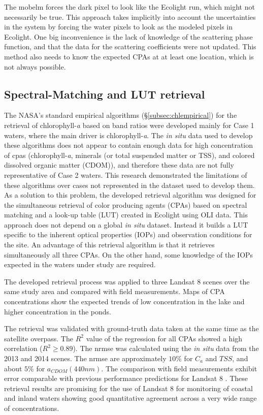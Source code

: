 The \gls{mobelm} forces the dark pixel to look like the Ecolight run, which might not necessarily be true. This approach takes implicitly into account the uncertainties in the system by forcing the water pixels to look as the modeled pixels in Ecolight. One big inconvenience is the lack of knowledge of the scattering phase function, and that the data for the scattering coefficients were not updated. This method also needs to know the expected CPAs at at least one location, which is not always possible.

\subsection{Spectral-Matching and LUT retrieval}
The NASA's standard empirical algorithms (\S\ref{subsec:chlempirical}) for the retrieval of chlorophyll-{\it a} based on band ratios were developed mainly for Case 1 waters, where the main driver is chlorophyll-{\it a}. The {\it in situ} data used to develop these algorithms does not appear to contain enough data for high concentration of \gls{cpas} (chlorophyll-{\it a}, minerals (or total suspended matter or TSS), and colored dissolved organic matter (CDOM)), and therefore these data are not fully representative of Case 2 waters. This research demonstrated the limitations of these algorithms over cases not represented in the dataset used to develop them. As a solution to this problem, the developed retrieval algorithm was designed for the simultaneous retrieval of color producing agents (CPAs) based on spectral matching and a look-up table (LUT) created in Ecolight using OLI data. This approach does not depend on a global {\it in situ} dataset. Instead it builds a LUT specific to the inherent optical properties (IOPs) and observation conditions for the site. An advantage of this retrieval algorithm is that it retrieves simultaneously all three CPAs. On the other hand, some knowledge of the IOPs expected in the waters under study are required.

The developed retrieval process was applied to three  Landsat 8 scenes over the same study area and compared with field measurements. Maps of CPA concentrations show the expected trends of low concentration in the lake and higher concentration in the ponds.  

The retrieval was validated with ground-truth data taken at the same time as the satellite overpass. The $R^2$ value of the regression for all CPAs showed a high correlation ($R^2\geq0.89$). The \gls{nrmse} was calculated using the {\it in situ} data from the 2013 and 2014 scenes. The \gls{nrmse} are approximately $10\%$ for $C_a$ and $TSS$, and about $5\%$ for $a_{CDOM}(440nm)$. The comparison with field measurements exhibit error comparable with previous performance predictions for Landsat 8 \citep{Gerace:2013}. These retrieval results are promising for the use of Landsat 8 for monitoring of coastal and inland waters showing good quantitative agreement across a very wide range of concentrations.

